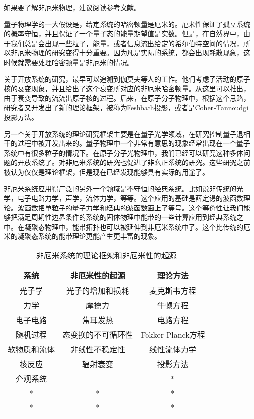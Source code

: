
如果要了解非厄米物理，建议阅读参考文献\cite{Ashida:2020dkc}。

量子物理学的一大假设是，给定系统的哈密顿量是厄米的。厄米性保证了孤立系统的概率守恒，并且保证了一个量子态的能量期望值是实数。但是，在自然界中，由于我们总是会出现一些粒子，能量，或者信息流出给定的希尔伯特空间的情况，所以非厄米物理的研究变得十分重要。因为凡是实际的系统，都会出现耗散现象，这时候就需要处理哈密顿量是非厄米的情况。

关于开放系统的研究，最早可以追溯到伽莫夫等人的工作。他们考虑了活动的原子核的衰变现象，并且给出了这个衰变所对应的非厄米哈密顿量。从这里可以推出，由于衰变导致的流流出原子核的过程。后来，在原子分子物理中，根据这个思路，研究者又开发出了新的理论框架，被称为Feshbach投影，或者是Cohen-Tannoudgi投影方法。

另一个关于开放系统的理论研究框架主要是在量子光学领域，在研究控制量子退相干的过程中被开发出来的。量子物理中一个非常有意思的现象经常出现在一个量子系统中有很多粒子的情况下。在原子分子光物理中，我们已经可以研究这种多体问题的开放系统了。对非厄米系统的研究也促进了非幺正系统的研究。这些研究之前被认为仅仅是理论框架，但是现在已经发现能够具有实际的用途了。

非厄米系统应用得广泛的另外一个领域是不守恒的经典系统。比如说非传统的光学，电子电路力学，声学，流体力学，等等。这个应用的基础是薛定谔的波函数理论。波函数把单粒子的量子力学和经典的波函数画上了等号。这个等价性让我们能够把满足周期性边界条件的系统的固体物理中能带的一些计算应用到经典系统之中。在凝聚态物理中，能带拓扑也可以被延伸到非厄米系统中了。这个比传统的厄米的凝聚态系统的能带理论更能产生更丰富的现象。

\begin{table}[ht]
\centering
\caption{非厄米系统的理论框架和非厄米性的起源}\label{tab_nonHer1}
\begin{tabular}{|c|c|c|}
\hline
系统 & 非厄米性的起源 & 理论方法 \\
\hline
光子学 & 光子的增加和损耗 & 麦克斯韦方程 \\
\hline
力学 & 摩擦力 & 牛顿方程 \\
\hline
电子电路 & 焦耳发热 & 电路方程 \\
\hline
随机过程 & 态变换的不可循环性 & Fokker-Planck方程 \\
\hline
软物质和流体 & 非线性不稳定性 & 线性流体力学 \\
\hline
核反应 & 辐射衰变 & 投影方法 \\
\hline
介观系统 &  & * \\
\hline
* & * & * \\
\hline
* & * & * \\
\hline
\end{tabular}
\end{table}


